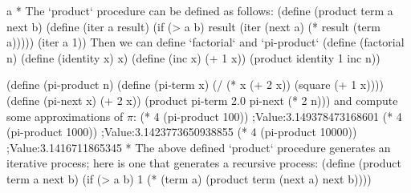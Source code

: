 \begitems\style a
* The `product` procedure can be defined as follows:
\begtt\scm
(define (product term a next b)
  (define (iter a result)
    (if (> a b)
        result
        (iter (next a) (* result (term a)))))
  (iter a 1))
\endtt
Then we can define `factorial` and `pi-product`
\begtt\scm
(define (factorial n)
  (define (identity x) x)
  (define (inc x) (+ 1 x))
  (product identity 1 inc n))

(define (pi-product n)
  (define (pi-term x)
    (/ (* x (+ 2 x))
       (square (+ 1 x))))
  (define (pi-next x)
    (+ 2 x))
  (product pi-term 2.0 pi-next (* 2 n)))
\endtt
and compute some approximations of $\pi$:
\begtt\scm
(* 4 (pi-product 100))
;Value:3.149378473168601
(* 4 (pi-product 1000))
;Value:3.1423773650938855
(* 4 (pi-product 10000))
;Value:3.1416711865345
\endtt
* The above defined `product` procedure generates an iterative process;  here is one that generates a recursive process:
\begtt\scm
(define (product term a next b)
  (if (> a b)
      1
      (* (term a)
         (product term (next a) next b))))
\endtt
\enditems
